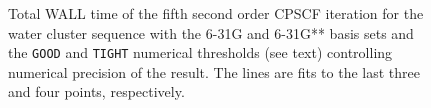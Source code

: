 \documentclass[prl,aps,twocolumn,showpacs,twocolumngrid,superbib]{revtex4}
\begin{document}
\begin{figure}[t]
  \caption{\protect
    Total WALL time of the fifth second order CPSCF iteration for
    the water cluster sequence with the 6-31G and 6-31G** 
    basis sets and the {\tt GOOD} and {\tt TIGHT} 
    numerical thresholds (see text) controlling numerical
    precision of the result. The lines are fits to the 
    last three and four points, respectively.
  }\label{Beta_scaling}
\end{figure}
\end{document}
